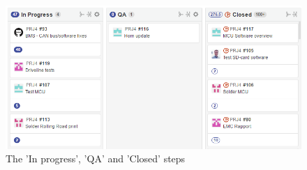 \begin{figure}
	\centering
	\includegraphics[width=0.7\linewidth]{SubPages/Images/Zenhub2}
	\caption{The 'In progress', 'QA' and 'Closed' steps}
	\label{fig:Zenhub2}
\end{figure}
